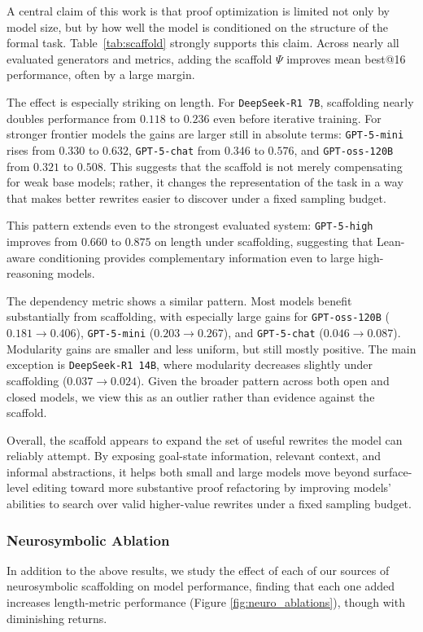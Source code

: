 A central claim of this work is that proof optimization is limited not only by model size, but by how well the model is conditioned on the structure of the formal task.
Table~\ref{tab:scaffold} strongly supports this claim.
Across nearly all evaluated generators and metrics, adding the scaffold $\Psi$ improves mean best@16 performance, often by a large margin.

The effect is especially striking on length.
For \texttt{DeepSeek-R1 7B}, scaffolding nearly doubles performance from $0.118$ to $0.236$ even before iterative training.
For stronger frontier models the gains are larger still in absolute terms: \texttt{GPT-5-mini} rises from $0.330$ to $0.632$, \texttt{GPT-5-chat} from $0.346$ to $0.576$, and \texttt{GPT-oss-120B} from $0.321$ to $0.508$.
This suggests that the scaffold is not merely compensating for weak base models; rather, it changes the representation of the task in a way that makes better rewrites easier to discover under a fixed sampling budget.

This pattern extends even to the strongest evaluated system: \texttt{GPT-5-high} improves from $0.660$ to $0.875$ on length under scaffolding, suggesting that Lean-aware conditioning provides complementary information even to large high-reasoning models.

The dependency metric shows a similar pattern.
Most models benefit substantially from scaffolding, with especially large gains for \texttt{GPT-oss-120B} ($0.181 \to 0.406$), \texttt{GPT-5-mini} ($0.203 \to 0.267$), and \texttt{GPT-5-chat} ($0.046 \to 0.087$).
Modularity gains are smaller and less uniform, but still mostly positive.
The main exception is \texttt{DeepSeek-R1 14B}, where modularity decreases slightly under scaffolding ($0.037 \to 0.024$).
Given the broader pattern across both open and closed models, we view this as an outlier rather than evidence against the scaffold.

Overall, the scaffold appears to expand the set of useful rewrites the model can reliably attempt.
By exposing goal-state information, relevant context, and informal abstractions, it helps both small and large models move beyond surface-level editing toward more substantive proof refactoring by improving models' abilities to search over valid higher-value rewrites under a fixed sampling budget.

\subsubsection{Neurosymbolic Ablation}
In addition to the above results, we study the effect of each of our sources of neurosymbolic scaffolding on model performance, finding that each one added increases length-metric performance (Figure \ref{fig:neuro_ablations}), though with diminishing returns.

